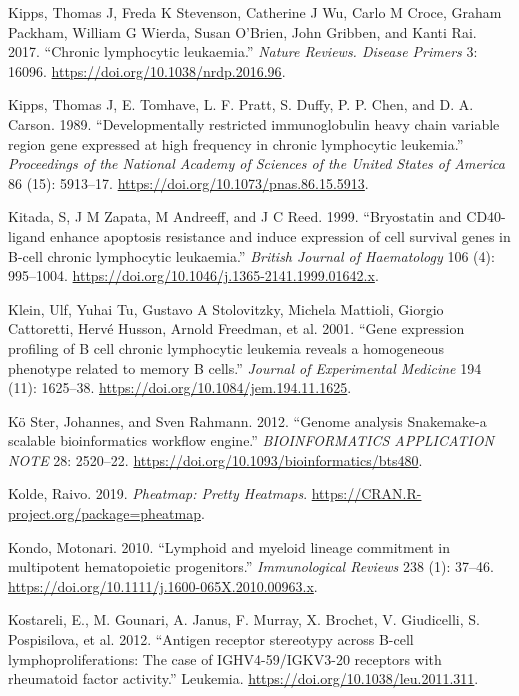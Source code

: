 \documentclass[11pt, a4paper, twosided]{book}
\newenvironment{CSLReferences}%
  {}%
  {\par}
\begin{document}
\begin{CSLReferences}{1}{0}
\leavevmode{}%
Kipps, Thomas J, Freda K Stevenson, Catherine J Wu, Carlo M Croce, Graham Packham, William G Wierda, Susan O'Brien, John Gribben, and Kanti Rai. 2017. {``{Chronic lymphocytic leukaemia.}''} \emph{Nature Reviews. Disease Primers} 3: 16096. \url{https://doi.org/10.1038/nrdp.2016.96}.

\leavevmode{}%
Kipps, Thomas J, E. Tomhave, L. F. Pratt, S. Duffy, P. P. Chen, and D. A. Carson. 1989. {``{Developmentally restricted immunoglobulin heavy chain variable region gene expressed at high frequency in chronic lymphocytic leukemia}.''} \emph{Proceedings of the National Academy of Sciences of the United States of America} 86 (15): 5913--17. \url{https://doi.org/10.1073/pnas.86.15.5913}.

\leavevmode{}%
Kitada, S, J M Zapata, M Andreeff, and J C Reed. 1999. {``{Bryostatin and CD40-ligand enhance apoptosis resistance and induce expression of cell survival genes in B-cell chronic lymphocytic leukaemia.}''} \emph{British Journal of Haematology} 106 (4): 995--1004. \url{https://doi.org/10.1046/j.1365-2141.1999.01642.x}.

\leavevmode{}%
Klein, Ulf, Yuhai Tu, Gustavo A Stolovitzky, Michela Mattioli, Giorgio Cattoretti, Hervé Husson, Arnold Freedman, et al. 2001. {``{Gene expression profiling of B cell chronic lymphocytic leukemia reveals a homogeneous phenotype related to memory B cells}.''} \emph{Journal of Experimental Medicine} 194 (11): 1625--38. \url{https://doi.org/10.1084/jem.194.11.1625}.

\leavevmode{}%
Kö Ster, Johannes, and Sven Rahmann. 2012. {``{Genome analysis Snakemake-a scalable bioinformatics workflow engine}.''} \emph{BIOINFORMATICS APPLICATION NOTE} 28: 2520--22. \url{https://doi.org/10.1093/bioinformatics/bts480}.

\leavevmode{}%
Kolde, Raivo. 2019. \emph{Pheatmap: Pretty Heatmaps}. \url{https://CRAN.R-project.org/package=pheatmap}.

\leavevmode{}%
Kondo, Motonari. 2010. {``{Lymphoid and myeloid lineage commitment in multipotent hematopoietic progenitors}.''} \emph{Immunological Reviews} 238 (1): 37--46. \url{https://doi.org/10.1111/j.1600-065X.2010.00963.x}.

\leavevmode{}%
Kostareli, E., M. Gounari, A. Janus, F. Murray, X. Brochet, V. Giudicelli, S. Pospisilova, et al. 2012. {``{Antigen receptor stereotypy across B-cell lymphoproliferations: The case of IGHV4-59/IGKV3-20 receptors with rheumatoid factor activity}.''} Leukemia. \url{https://doi.org/10.1038/leu.2011.311}.


\end{CSLReferences}
\end{document}
